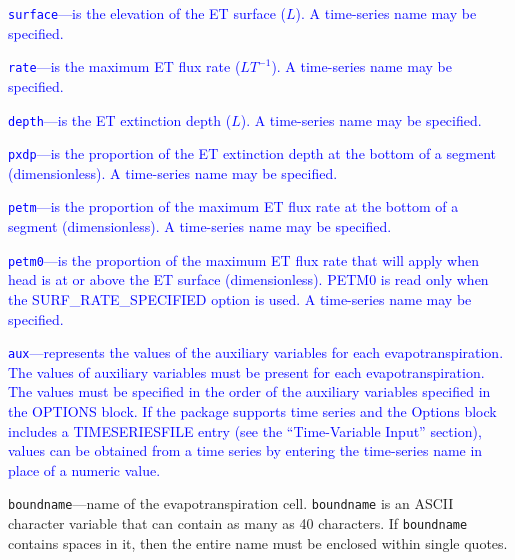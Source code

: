 \item \textcolor{blue}{\texttt{surface}---is the elevation of the ET surface ($L$). A time-series name may be specified.}

\item \textcolor{blue}{\texttt{rate}---is the maximum ET flux rate ($LT^{-1}$).  A time-series name may be specified.}

\item \textcolor{blue}{\texttt{depth}---is the ET extinction depth ($L$).  A time-series name may be specified.}

\item \textcolor{blue}{\texttt{pxdp}---is the proportion of the ET extinction depth at the bottom of a segment (dimensionless).  A time-series name may be specified.}

\item \textcolor{blue}{\texttt{petm}---is the proportion of the maximum ET flux rate at the bottom of a segment (dimensionless).  A time-series name may be specified.}

\item \textcolor{blue}{\texttt{petm0}---is the proportion of the maximum ET flux rate that will apply when head is at or above the ET surface (dimensionless). PETM0 is read only when the SURF\_RATE\_SPECIFIED option is used. A time-series name may be specified.}

\item \textcolor{blue}{\texttt{aux}---represents the values of the auxiliary variables for each evapotranspiration. The values of auxiliary variables must be present for each evapotranspiration. The values must be specified in the order of the auxiliary variables specified in the OPTIONS block.  If the package supports time series and the Options block includes a TIMESERIESFILE entry (see the ``Time-Variable Input'' section), values can be obtained from a time series by entering the time-series name in place of a numeric value.}

\item \texttt{boundname}---name of the evapotranspiration cell.  \texttt{boundname} is an ASCII character variable that can contain as many as 40 characters.  If \texttt{boundname} contains spaces in it, then the entire name must be enclosed within single quotes.


